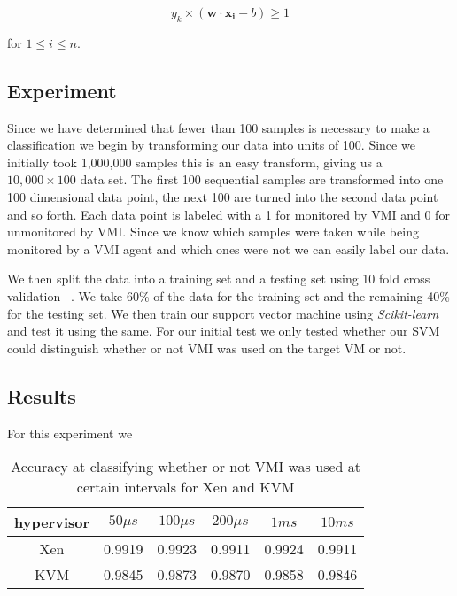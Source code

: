 \begin{equation}\label{SVMFinal}
	y_k \times (\bm{w}\cdot \bm{x_i} - b) \ge 1 
\end{equation}

for $1 \le i \le n$. 


\subsection{Experiment}

Since we have determined that fewer than 100 samples is necessary to make a classification we begin by transforming our data into units of 100. Since we initially took 1,000,000 samples this is an easy transform, giving us a $10,000 \times 100$ data set. The first 100 sequential samples are transformed into one 100 dimensional data point, the next 100 are turned into the second data point and so forth. Each data point is labeled with a 1 for monitored by VMI and 0 for unmonitored by VMI. Since we know which samples were taken while being monitored by a VMI agent and which ones were not we can easily label our data. 

We then split the data into a training set and a testing set using 10 fold cross validation ~\cite{bishop_pattern_2006}. We take 60\% of the data for the training set and the remaining 40\% for the testing set. We then train our support vector machine using \textit{Scikit-learn} and test it using the same. For our initial test we only tested whether our SVM could distinguish whether or not VMI was used on the target VM or not. 


\subsection{Results}

For this experiment we 
\begin{table}\label{SVMResults}
    \centering
      \begin{tabular}{| c | c | c | c | c | c |}
        \hline
        hypervisor & $50\mu s$ & $100\mu s$ & $200 \mu s$ & $1ms$ & $10ms$ \\ \hline
        Xen & 0.9919 & 0.9923 & 0.9911 & 0.9924 & 0.9911 \\ \hline 
        KVM & 0.9845 & 0.9873 & 0.9870 & 0.9858 & 0.9846 \\ \hline   
    \end{tabular}
    \caption{Accuracy at classifying whether or not VMI was used at certain intervals for Xen and KVM}
  \end{table}

